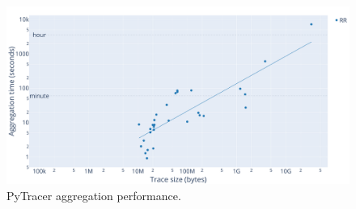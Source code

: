 \documentclass[10pt,journal,compsoc]{IEEEtran}
\newcommand{\pytracer}[0]{PyTracer\xspace}
\begin{document}


\begin{figure}
    \centering
    \includegraphics[width=\linewidth]{figure/performance_parsing.pdf}
    \caption{\pytracer aggregation performance.
    }
    \label{fig:performance_parsing}
\end{figure}
\end{document}
